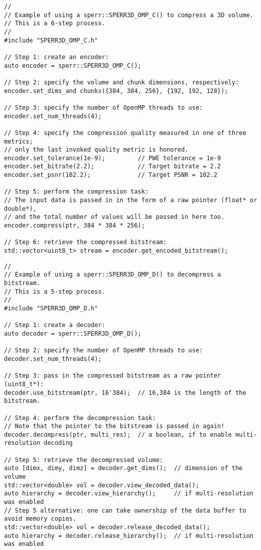 \documentclass{article}
\begin{document}
\begin{verbatim}
//
// Example of using a sperr::SPERR3D_OMP_C() to compress a 3D volume.
// This is a 6-step process.
//
#include "SPERR3D_OMP_C.h"

// Step 1: create an encoder:
auto encoder = sperr::SPERR3D_OMP_C();

// Step 2: specify the volume and chunk dimensions, respectively:
encoder.set_dims_and chunks({384, 384, 256}, {192, 192, 128});

// Step 3: specify the number of OpenMP threads to use:
encoder.set_num_threads(4);

// Step 4: specify the compression quality measured in one of three metrics;
// only the last invoked quality metric is honored.
encoder.set_tolerance(1e-9);         // PWE tolerance = 1e-9
encoder.set_bitrate(2.2);            // Target bitrate = 2.2
encoder.set_psnr(102.2);             // Target PSNR = 102.2

// Step 5: perform the compression task:
// The input data is passed in in the form of a raw pointer (float* or double*),
// and the total number of values will be passed in here too.
encoder.compress(ptr, 384 * 384 * 256);

// Step 6: retrieve the compressed bitstream:
std::vector<uint8_t> stream = encoder.get_encoded_bitstream();
\end{verbatim}

\begin{verbatim}
//
// Example of using a sperr::SPERR3D_OMP_D() to decompress a bitstream.
// This is a 5-step process.
//
#include "SPERR3D_OMP_D.h"

// Step 1: create a decoder:
auto decoder = sperr::SPERR3D_OMP_D();

// Step 2: specify the number of OpenMP threads to use:
decoder.set_num_threads(4);

// Step 3: pass in the compressed bitstream as a raw pointer (uint8_t*):
decoder.use_bitstream(ptr, 16'384);  // 16,384 is the length of the bitstream.

// Step 4: perform the decompression task:
// Note that the pointer to the bitstream is passed in again!
decoder.decompress(ptr, multi_res);  // a boolean, if to enable multi-resolution decoding

// Step 5: retrieve the decompressed volume:
auto [dimx, dimy, dimz] = decoder.get_dims();  // dimension of the volume
std::vector<double> vol = decoder.view_decoded_data();
auto hierarchy = decoder.view_hierarchy();     // if multi-resolution was enabled
// Step 5 alternative: one can take ownership of the data buffer to avoid memory copies.
std::vector<double> vol = decoder.release_decoded_data();
auto hierarchy = decoder.release_hierarchy();  // if multi-resolution was enabled
\end{verbatim}
\end{document}
